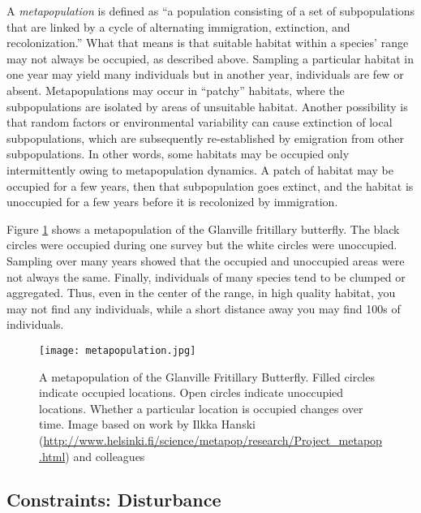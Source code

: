 \documentclass[11pt, hidelinks]{article}
\begin{document}
A \emph{metapopulation} is defined as ``a population consisting of a set of subpopulations that are linked by a cycle of alternating immigration, extinction, and recolonization.''  What that means is that suitable habitat within a species' range may not always be occupied, as described above.  Sampling a particular habitat in one year may yield many individuals but in another year, individuals are few or absent.  Metapopulations may occur in ``patchy'' habitats, where the subpopulations are isolated by areas of unsuitable habitat.  Another possibility is that random factors or environmental variability can cause extinction of local subpopulations, which are subsequently re-established by emigration from other subpopulations. In other words, some habitats may be occupied only intermittently owing to metapopulation dynamics. A patch of habitat may be occupied for a few years, then that subpopulation goes extinct, and the habitat is unoccupied for a few years before it is recolonized by immigration. 

Figure \ref{metapop} shows a metapopulation of the Glanville fritillary butterfly.  The black circles were occupied during one survey but the white circles were unoccupied.  Sampling over many years showed that the occupied and unoccupied areas were not always the same.  Finally, individuals of many species tend to be clumped or aggregated.  Thus, even in the center of the range, in high quality habitat, you may not find any individuals, while a short distance away you may find 100s of individuals.

\begin{figure}[hb]
	\centering
	\texttt{[image: metapopulation.jpg]}
	\caption{A metapopulation of the Glanville Fritillary Butterfly. Filled circles indicate occupied locations. Open circles indicate unoccupied locations. Whether a particular location is occupied changes over time. Image based on work by Ilkka Hanski (\url{http://www.helsinki.fi/science/metapop/research/Project_metapop.html}) and colleagues \label{metapop}}
\end{figure}

\subsection{Constraints: Disturbance}
\end{document}
